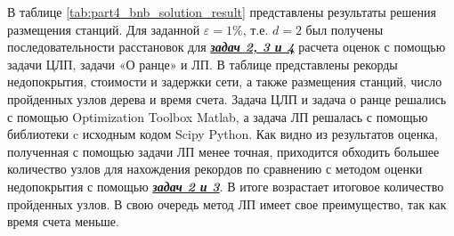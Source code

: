 В таблице \cref{tab:part4_bnb_solution_result} представлены результаты решения размещения станций. Для заданной $\varepsilon=1\%$, т.е. $d=2$ был получены последовательности расстановок для \underline{\textit{\textbf{задач 2, 3 и 4}}} расчета оценок с помощью задачи ЦЛП, задачи «О ранце» и ЛП. В таблице представлены рекорды недопокрытия, стоимости и задержки сети, а также размещения станций, число пройденных узлов дерева и время счета.
Задача ЦЛП и задача о ранце решались с помощью Optimization Toolbox Matlab, а задача ЛП решалась с помощью библиотеки c исходным кодом Scipy Python. Как видно из результатов оценка, полученная с помощью задачи ЛП менее точная, приходится обходить большее количество узлов для нахождения рекордов по сравнению с методом оценки недопокрытия с помощью \underline{\textit{\textbf{задач 2 и 3}}}. В итоге возрастает итоговое количество пройденных узлов. В свою очередь метод ЛП имеет свое преимущество, так как время счета меньше.


